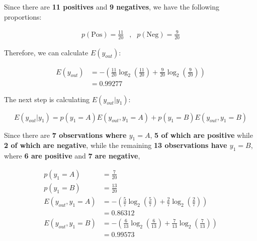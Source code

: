\documentclass[12pt]{article}
\begin{document}
\begin{enumerate}[leftmargin=\labelsep]
          Since there are \textbf{11 positives} and \textbf{9 negatives}, we have the following proportions:

          \[
              \begin{array}{lcr}
                  p(\text{Pos}) = \frac{11}{20} & , & p(\text{Neg}) = \frac{9}{20}
              \end{array}
          \]

          Therefore, we can calculate $E(y_{out})$:

          \[
              \begin{aligned}
                  E(y_{out}) & = - \left(\frac{11}{20} \log_2\left(\frac{11}{20}\right) + \frac{9}{20} \log_2\left(\frac{9}{20}\right)\right) \\
                             & = 0.99277
              \end{aligned}
          \]

          The next step is calculating $E(y_{out} | y_1)$:

          \begin{equation}\label{ex4-e-yout-y1}
              E(y_{out} | y_1) = p(y_1 = A) E(y_{out} , y_1 = A) + p(y_1 = B) E(y_{out} , y_1 = B)
          \end{equation}

          Since there are \textbf{7 observations where \(y_1 = A\)}, \textbf{5 of which are positive} while \textbf{2 of which are negative},
          while the remaining \textbf{13 observations have \(y_1 = B\)}, where \textbf{6 are positive} and \textbf{7 are negative},

          \[
              \begin{aligned}
                  p(y_1 = A)          & = \frac{7}{20}                                                                                               \\
                  p(y_1 = B)          & = \frac{13}{20}                                                                                              \\
                  E(y_{out}, y_1 = A) & = - \left(\frac{5}{7} \log_2\left(\frac{5}{7}\right) + \frac{2}{7} \log_2\left(\frac{2}{7}\right)\right)     \\
                                      & = 0.86312                                                                                                    \\
                  E(y_{out}, y_1 = B) & = - \left(\frac{6}{13} \log_2\left(\frac{6}{13}\right) + \frac{7}{13} \log_2\left(\frac{7}{13}\right)\right) \\
                                      & = 0.99573
              \end{aligned}
          \]


\end{enumerate}
\end{document}
